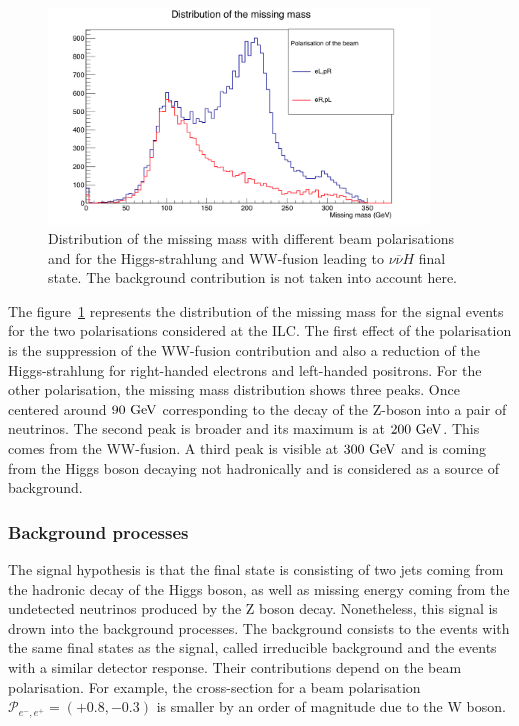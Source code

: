     \begin{figure}[!h]
      \centering
      \includegraphics[width = 0.9\textwidth]{Pictures/Higgs/mMiss.png}
      \caption{Distribution of the missing mass with different beam polarisations and for the Higgs-strahlung and WW-fusion leading to $\nu\overline{\nu}H$ final state.
      The background contribution is not taken into account here.}
      \label{fig:mMiss}
    \end{figure}

    The figure~\ref{fig:mMiss} represents the distribution of the missing mass for the signal events for the two polarisations considered at the \gls{ILC}.
    The first effect of the polarisation is the suppression of the WW-fusion contribution and also a reduction of the Higgs-strahlung for right-handed electrons and left-handed positrons.
    For the other polarisation, the missing mass distribution shows three peaks. 
    Once centered around $90~\rm{GeV}$ corresponding to the decay of the Z-boson into a pair of neutrinos.
    The second peak is broader and its maximum is at $200~\rm{GeV}$.
    This comes from the WW-fusion.
    A third peak is visible at $300~\rm{GeV}$ and is coming from the Higgs boson decaying not hadronically and is considered as a source of background.    

  \subsubsection{Background processes}

    The signal hypothesis is that the final state is consisting of two jets coming from the hadronic decay of the Higgs boson, as well as missing energy coming from the undetected neutrinos produced by the Z boson decay.
    Nonetheless, this signal is drown into the background processes.
    The background consists to the events with the same final states as the signal, called irreducible background and the events with a similar detector response.
    Their contributions depend on the beam polarisation.
    For example, the cross-section for a beam polarisation $\mathcal{P}_{e^-,e^+} = (+0.8,-0.3)$ is smaller by an order of magnitude due to the W boson.

